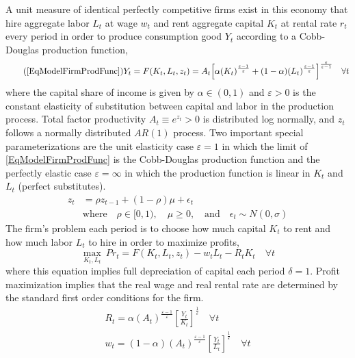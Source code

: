\documentclass[letterpaper,12pt]{article}
\theoremstyle{definition}
\newcommand\ve{\varepsilon}
\begin{document}
    A unit measure of identical perfectly competitive firms exist in this economy that hire aggregate labor $L_t$ at wage $w_t$ and rent aggregate capital $K_t$ at rental rate $r_t$ every period in order to produce consumption good $Y_t$ according to a Cobb-Douglas production function,
    \begin{equation}\tag{\ref{EqModelFirmProdFunc}}
       Y_t = F(K_t, L_t, z_t) = A_t\Bigl[\alpha(K_t)^\frac{\ve-1}{\ve} + (1 - \alpha)(L_t)^\frac{\ve-1}{\ve}\Bigr]^\frac{\ve}{\ve-1} \quad\forall t
    \end{equation}
    where the capital share of income is given by $\alpha\in(0,1)$ and $\ve>0$ is the constant elasticity of substitution between capital and labor in the production process. Total factor productivity $A_t \equiv e^{z_t}>0$ is distributed log normally, and $z_t$ follows a normally distributed $AR(1)$ process. Two important special parameterizations are the unit elasticity case $\ve=1$ in which the limit of \eqref{EqModelFirmProdFunc} is the Cobb-Douglas production function and the perfectly elastic case $\ve=\infty$ in which the production function is linear in $K_t$ and $L_t$ (perfect substitutes).
    \begin{equation}\label{EqModelFirmZAR1}
      \begin{split}
        z_t &= \rho z_{t-1} + (1-\rho)\mu + \epsilon_t \\
        &\text{where}\quad \rho\in[0,1),\quad\mu\geq 0, \quad\text{and}\quad \epsilon_t \sim N(0,\sigma)
      \end{split}
    \end{equation}
    The firm's problem each period is to choose how much capital $K_t$ to rent and how much labor $L_t$ to hire in order to maximize profits,
    \begin{equation}\label{EqModelFirmProfMax}
      \max_{K_t, L_t}\:Pr_t = F(K_t, L_t, z_t) - w_t L_t - R_t K_t \quad\forall t
    \end{equation}
    where this equation implies full depreciation of capital each period $\delta=1$. Profit maximization implies that the real wage and real rental rate are determined by the standard first order conditions for the firm.
    \begin{gather}
      R_t = \alpha(A_t)^\frac{\ve-1}{\ve}\left[\frac{Y_t}{K_t}\right]^\frac{1}{\ve} \quad\forall t \label{EqModelFirm_FOCK} \\
      w_t = (1 - \alpha)(A_t)^\frac{\ve-1}{\ve}\left[\frac{Y_t}{L_t}\right]^\frac{1}{\ve} \quad\forall t \label{EqModelFirm_FOCL}
    \end{gather}
\end{document}
